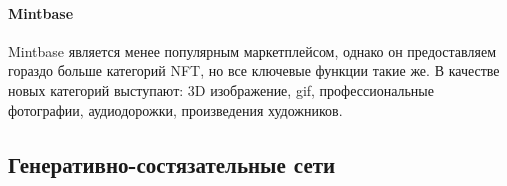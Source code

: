 \paragraph{Mintbase}

Mintbase является менее популярным маркетплейсом, однако он предоставляем гораздо больше категорий NFT, но все ключевые функции такие же. В качестве новых категорий выступают: 3D изображение, gif, профессиональные фотографии, аудиодорожки, произведения художников.

\subsection{Генеративно-состязательные сети}
